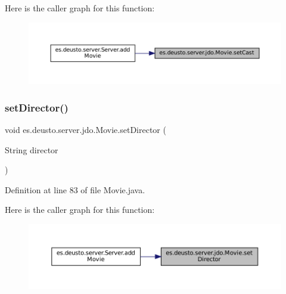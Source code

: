 Here is the caller graph for this function\+:\nopagebreak
\begin{figure}[H]
\begin{center}
\leavevmode
\includegraphics[width=350pt]{classes_1_1deusto_1_1server_1_1jdo_1_1_movie_aab7fa1af2944677769c47300ea061e3b_icgraph}
\end{center}
\end{figure}
\mbox{\label{classes_1_1deusto_1_1server_1_1jdo_1_1_movie_a2739245f04bc6627b5a00ddeb6fba0fc}} 
\subsubsection{\texorpdfstring{setDirector()}{setDirector()}}
{\footnotesize\ttfamily void es.\+deusto.\+server.\+jdo.\+Movie.\+set\+Director (\begin{DoxyParamCaption}\item[{String}]{director }\end{DoxyParamCaption})}



Definition at line 83 of file Movie.\+java.

Here is the caller graph for this function\+:\nopagebreak
\begin{figure}[H]
\begin{center}
\leavevmode
\includegraphics[width=350pt]{classes_1_1deusto_1_1server_1_1jdo_1_1_movie_a2739245f04bc6627b5a00ddeb6fba0fc_icgraph}
\end{center}
\end{figure}
\mbox{\label{classes_1_1deusto_1_1server_1_1jdo_1_1_movie_a045b89a0ae1e637d8944f34c97f8c34e}} 
